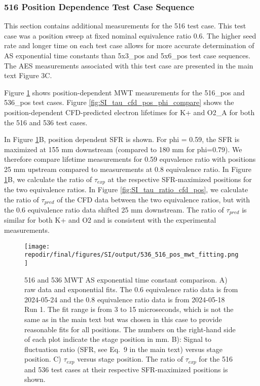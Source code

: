 \clearpage
\subsubsection{516 Position Dependence Test Case Sequence}

This section contains additional measurements for the 516 test case. This test case was a position sweep at fixed nominal equivalence ratio 0.6. The higher seed rate and longer time on each test case allows for more accurate determination of AS exponential time constants than 5x3\_pos and 5x6\_pos test case sequences. The AES measurements associated with this test case are presented in the main text Figure 3C. 

Figure \ref{fig:SI_536_516_pos_mwt_fitting} shows position-dependent MWT measurements for the 516\_pos and 536\_pos test cases. Figure \ref{fig:SI_tau_cfd_pos_phi_compare} shows the position-dependent CFD-predicted electron lifetimes for K+ and O2\_A for both the 516 and 536 test cases. 

In Figure \ref{fig:SI_536_516_pos_mwt_fitting}B, position dependent SFR is shown. For phi = 0.59, the SFR is maximized at 155 mm downstream (compared to 180 mm for phi=0.79). We therefore compare lifetime measurements for 0.59 equvalence ratio with positions 25 mm upstream compared to measurements at 0.8 equivalence ratio. In Figure \ref{fig:SI_536_516_pos_mwt_fitting}B, we calculate the ratio of $\tau_{exp}$ at the respective SFR-maximized positions for the two equivalence ratios. In Figure \ref{fig:SI_tau_ratio_cfd_pos}, we calculate the ratio of $\tau_{pred}$ of the CFD data between the two equivalence ratios, but with the 0.6 equivalence ratio data shifted 25 mm downstream. The ratio of $\tau_{pred}$ is similar for both K+ and O2 and is consistent with the experimental measurements.

\begin{figure}[]
\centering
\texttt{[image: \\repodir/final/figures/SI/output/536\_516\_pos\_mwt\_fitting.png]}
\caption{516 and 536 MWT AS exponential time constant comparison. A) raw data and exponential fits. The 0.6 equivalence ratio data is from 2024-05-24 and the 0.8 equivalence ratio data is from 2024-05-18 Run 1. The fit range is from 3 to 15 microseconds, which is not the same as in the main text but was chosen in this case to provide reasonable fits for all positions. The numbers on the right-hand side of each plot indicate the stage position in mm. B): Signal to fluctuation ratio (SFR, see Eq.\ 9 in the main text) versus stage position. C) $\tau_{exp}$ versus stage position. The ratio of $\tau_{exp}$ for the 516 and 536 test cases at their respective SFR-maximized positions is shown.} 
\label{fig:SI_536_516_pos_mwt_fitting}
\end{figure}

